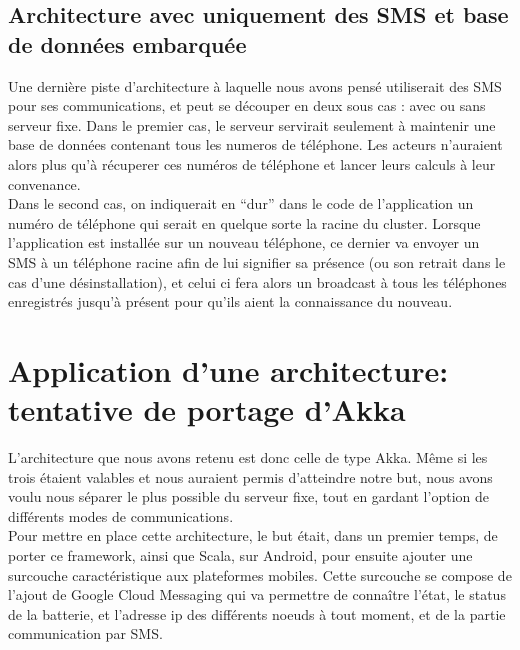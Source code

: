 \documentclass[a4paper,12pt]{article}
\begin{document}
\subsection{Architecture avec uniquement des SMS et base de données embarquée}
Une dernière piste d’architecture à laquelle nous avons pensé utiliserait des
SMS pour ses communications, et peut se découper en deux sous cas : avec ou
sans serveur fixe. Dans le premier cas, le serveur servirait seulement à
maintenir une base de données contenant tous les numeros de téléphone. Les
acteurs n’auraient alors plus qu’à récuperer ces numéros de téléphone et lancer
leurs calculs à leur convenance.\\ Dans le second cas, on indiquerait en “dur”
dans le code de l’application un numéro de téléphone qui serait en quelque
sorte la racine du cluster. Lorsque l’application est installée sur un nouveau
téléphone, ce dernier va envoyer un SMS à un téléphone racine afin de lui
signifier sa présence (ou son retrait dans le cas d’une désinstallation), et
celui ci fera alors un broadcast à tous les téléphones enregistrés jusqu’à
présent pour qu’ils aient la connaissance du nouveau.

\section{Application d'une architecture: tentative de portage d'Akka}
L’architecture que nous avons retenu est donc celle de type Akka. Même si les
trois étaient valables et nous auraient permis d’atteindre notre but, nous
avons voulu nous séparer le plus possible du serveur fixe, tout en gardant
l’option de différents modes de communications.\\ Pour mettre en place cette
architecture, le but était, dans un premier temps, de porter ce framework,
ainsi que Scala, sur Android, pour ensuite ajouter une surcouche
caractéristique aux plateformes mobiles. Cette surcouche se compose de l’ajout
de Google Cloud Messaging qui va permettre de connaître l’état, le status de la
batterie, et l’adresse ip des différents noeuds à tout moment, et de la partie
communication par SMS.
\end{document}
